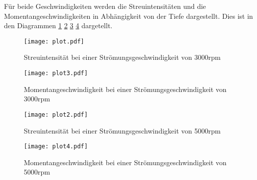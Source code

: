 Für beide Geschwindigkeiten werden die Streuintensitäten und die Momentangeschwindigkeiten in Abhängigkeit von der Tiefe dargestellt. Dies ist in den Diagrammen \ref{fig:plot1}
\ref{fig:plot2} \ref{fig:plot3} \ref{fig:plot4} dargetellt.


\begin{figure}
  \centering
  \texttt{[image: plot.pdf]}
  \caption{Streuintensität bei einer Strömungsgeschwindigkeit von 3000rpm}
  \label{fig:plot1}
\end{figure}

\begin{figure}
  \centering
  \texttt{[image: plot3.pdf]}
  \caption{Momentangeschwindigkeit bei einer Strömungsgeschwindigkeit von 3000rpm}
  \label{fig:plot2}
\end{figure}


\begin{figure}
  \centering
  \texttt{[image: plot2.pdf]}
  \caption{Streuintensität bei einer Strömungsgeschwindigkeit von 5000rpm}
  \label{fig:plot3}
\end{figure}

\begin{figure}
  \centering
  \texttt{[image: plot4.pdf]}
  \caption{Momentangeschwindigkeit bei einer Strömungsgeschwindigkeit von 5000rpm}
  \label{fig:plot4}
\end{figure}
